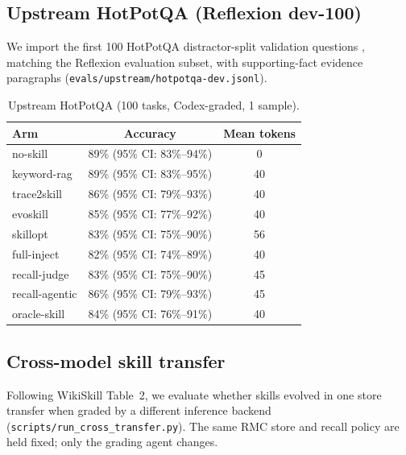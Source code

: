 \documentclass[11pt]{article}
\begin{document}
\subsection{Upstream HotPotQA (Reflexion dev-100)}
\label{sec:hotpot}

We import the first 100 HotPotQA distractor-split validation questions \citep{yang2018hotpotqa}, matching the Reflexion evaluation subset, with supporting-fact evidence paragraphs (\texttt{evals/upstream/hotpotqa-dev.jsonl}).

\begin{table}[t]
  \centering
  \caption{Upstream HotPotQA (100 tasks, Codex-graded, 1 sample).}
  \label{tab:hotpot_upstream}
  \begin{tabular}{lcc}
    \toprule
    Arm & Accuracy & Mean tokens \\
    \midrule
    no\mbox{-}skill & 89\% (95\% CI: 83\%--94\%) & 0 \\
    keyword\mbox{-}rag & 89\% (95\% CI: 83\%--95\%) & 40 \\
    trace2skill & 86\% (95\% CI: 79\%--93\%) & 40 \\
    evoskill & 85\% (95\% CI: 77\%--92\%) & 40 \\
    skillopt & 83\% (95\% CI: 75\%--90\%) & 56 \\
    full\mbox{-}inject & 82\% (95\% CI: 74\%--89\%) & 40 \\
    recall\mbox{-}judge & 83\% (95\% CI: 75\%--90\%) & 45 \\
    recall\mbox{-}agentic & 86\% (95\% CI: 79\%--93\%) & 45 \\
    oracle\mbox{-}skill & 84\% (95\% CI: 76\%--91\%) & 40 \\
    \bottomrule
  \end{tabular}
\end{table}

\subsection{Cross-model skill transfer}
\label{sec:cross_transfer}

Following WikiSkill Table~2, we evaluate whether skills evolved in one store transfer when graded by a different inference backend (\texttt{scripts/run\_cross\_transfer.py}).
The same RMC store and recall policy are held fixed; only the grading agent changes.
\end{document}
